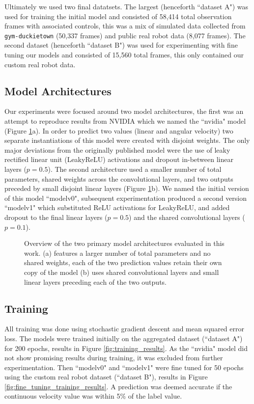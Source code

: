\documentclass{article}
\begin{document}
Ultimately we used two final datatsets. The largest (henceforth ``dataset A") was used for training the initial model and consisted of 58,414 total observation frames with associated controls, this was a mix of simulated data collected from \texttt{gym-duckietown} (50,337 frames) and public real robot data (8,077 frames). The second dataset (henceforth ``dataset B") was used for experimenting with fine tuning our models and consisted of 15,560 total frames, this only contained our custom real robot data.

\subsection{Model Architectures} \label{sec:model_arch}

    Our experiments were focused around two model architectures, the first was an attempt to reproduce results from NVIDIA \cite{DBLP:journals/corr/BojarskiTDFFGJM16} which we named the ``nvidia" model (Figure \ref{fig:model_arch}a). In order to predict two values (linear and angular velocity) two separate instantiations of this model were created with disjoint weights. The only major deviations from the originally published model were the use of leaky rectified linear unit (LeakyReLU) activations and dropout in-between linear layers ($p=0.5$).
    The second architecture used a smaller number of total parameters, shared weights across the convolutional layers, and two outputs preceded by small disjoint linear layers (Figure \ref{fig:model_arch}b). We named the initial version of this model ``modelv0", subsequent experimentation produced a second version ``modelv1" which substituted ReLU activations for LeakyReLU, and added dropout to the final linear layers ($p=0.5$) and the shared convolutional layers ($p=0.1$).

\begin{figure}
\centering
    \caption{Overview of the two primary model architectures evaluated in this work. (a) features a larger number of total parameters and no shared weights, each of the two prediction values retain their own copy of the model (b) uses shared convolutional layers and small linear layers preceding each of the two outputs.}
\label{fig:model_arch}
\end{figure}

\subsection{Training}
All training was done using stochastic gradient descent and mean squared error loss. The models were trained initially on the aggregated dataset (``dataset A") for 200 epochs, results in Figure \ref{fig:training_results}. As the ``nvidia" model did not show promising results during training, it was excluded from further experimentation. Then ``modelv0" and ``modelv1" were fine tuned for 50 epochs using the custom real robot dataset (``dataset B"), results in Figure \ref{fig:fine_tuning_training_results}. A prediction was deemed accurate if the continuous velocity value was within 5\% of the label value.
\end{document}
